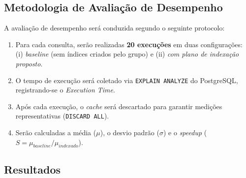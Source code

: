 \documentclass[12pt,a4paper]{article}
\begin{document}
\subsection{Metodologia de Avaliação de Desempenho}
\label{subsec:metodologia-desempenho}

A avaliação de desempenho será conduzida segundo o seguinte protocolo:
\begin{enumerate}[leftmargin=2cm]
    \item Para cada consulta, serão realizadas \textbf{20 execuções} em duas
          configurações: (i) \emph{baseline} (sem índices criados pelo grupo)
          e (ii) \emph{com plano de indexação proposto}.
    \item O tempo de execução será coletado via \texttt{EXPLAIN ANALYZE} do
          PostgreSQL, registrando-se o \emph{Execution Time}.
    \item Após cada execução, o \emph{cache} será descartado para garantir
          medições representativas (\texttt{DISCARD ALL}).
    \item Serão calculadas a média ($\mu$), o desvio padrão ($\sigma$) e o
          \emph{speedup} ($S = \mu_{baseline} / \mu_{indexado}$).
\end{enumerate}

\subsection{Resultados}
\label{subsec:resultados}
\end{document}
